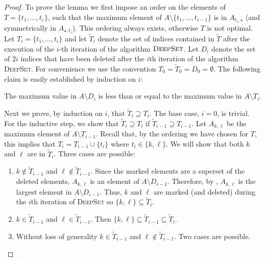 \documentclass{elsart}
\begin{document}
\begin{proof}
To prove the lemma we first impose an order on the elements of
$T=\{t_1,\ldots,t_c\}$, such that the maximum element of $A \setminus
\{t_1,\ldots,t_{i-1}\}$ is in $A_{t_{i},\star}$ (and symmetrically in
$A_{\star,t_{i}}$).  This ordering always exists, otherwise
$T$ is not optimal.  Let $T_i = \{t_1,\ldots,t_i\}$ and let
$\tilde{T}_i$ denote the set of indices contained in $\tilde{T}$ after
the execution of the $i$-th iteration of the algorithm
$\textsc{DeepSet}$.  Let $D_i$ denote the set of $2i$ indices that
have been deleted after the $i$th iteration of the algorithm
\textsc{DeepSet}.  For convenience we use the convention
$T_0=\tilde{T}_0=D_0=\emptyset$.  The following claim is easily
established by induction on $i$:

\begin{clm}
The maximum value in $A\setminus D_i$ is less than or equal to the
maximum value in $A\setminus T_i$.
\end{clm}

Next we prove, by induction on $i$, that $\tilde{T}_{i}\supseteq T_i$.
The base case, $i=0$, is trivial.  For the inductive step, we show
that $\tilde{T}_i \supseteq T_i$ if $\tilde{T}_{i-1} \supseteq
T_{i-1}$.  Let $A_{k,\ell}$ be the maximum element of $A \setminus
T_{i-1}$.  Recall that, by the ordering we have chosen for $T$, this
implies that $T_i=T_{i-1}\cup\{t_i\}$ where $t_i\in\{k,\ell\}$.  We
will show that both $k$ and $\ell$ are in $\tilde{T}_i$. Three cases
are possible: 

\begin{enumerate}

\item $k \not \in \tilde{T}_{i-1}$ and $\ell \not \in
\tilde{T}_{i-1}$.  Since the marked elements are a superset of the
deleted elements, $A_{k,\ell}$ is an element of $A \setminus D_{i-1}$.
Therefore, by , $A_{k,\ell}$ is the largest
element in $A\setminus D_{i-1}$.  Thus, $k$ and $\ell$ are marked (and
deleted) during the $i$th iteration of \textsc{DeepSet} so
$\{k,\ell\}\subseteq\tilde{T}_i$. 

\item $k \in \tilde{T}_{i-1}$ and $\ell \in \tilde{T}_{i-1}$.  Then
$\{k,\ell\}\subseteq \tilde{T}_{i-1}\subseteq \tilde{T}_i$.

\item Without loss of generality $k \in \tilde{T}_{i-1}$ and $\ell \not
\in \tilde{T}_{i-1}$. Two cases are possible.


\end{enumerate}
\end{proof}
\end{document}
